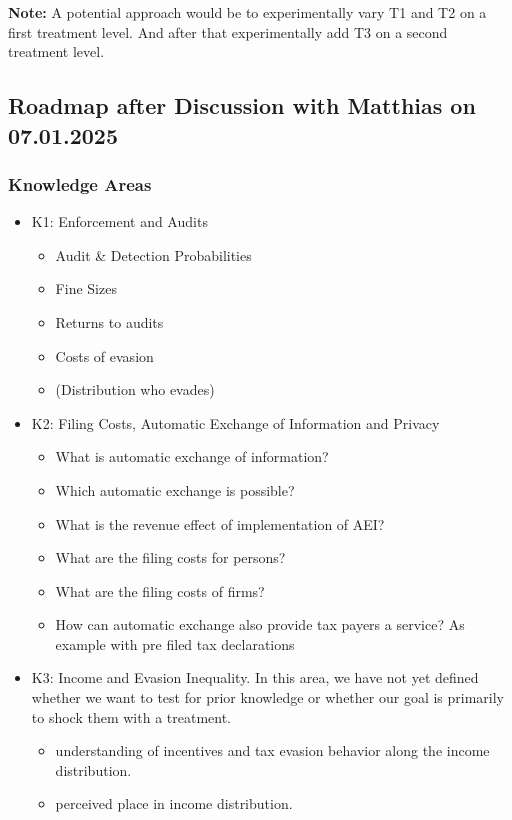 \documentclass[a4paper, 12pt]{article}
\begin{document}
\textbf{Note:} A potential approach would be to experimentally vary T1 and T2 on a first treatment level. And after that experimentally add T3 on a second treatment level. 
\subsection{Roadmap after Discussion with Matthias on 07.01.2025}
\subsubsection{Knowledge Areas}
\begin{itemize}
    \item K1: Enforcement and Audits
    \begin{itemize}
        \item Audit \& Detection Probabilities
        \item Fine Sizes
        \item Returns to audits
        \item Costs of evasion
        \item (Distribution who evades)
    \end{itemize}
    \item K2: Filing Costs, Automatic Exchange of Information and Privacy
    \begin{itemize}
        \item What is automatic exchange of information?
        \item Which automatic exchange is possible?
        \item What is the revenue effect of implementation of AEI? 
        \item What are the filing costs for persons?
        \item What are the filing costs of firms?
        \item How can automatic exchange also provide tax payers a service? As example with pre filed tax declarations
    \end{itemize}
    \item K3: Income and Evasion Inequality. In this area, we have not yet defined whether we want to test for prior knowledge or whether our goal is primarily to shock them with a treatment. 
    \begin{itemize}
        \item understanding of incentives and tax evasion behavior along the income distribution. 
        \item perceived place in income distribution. 
    \end{itemize}
\end{itemize}
\end{document}

